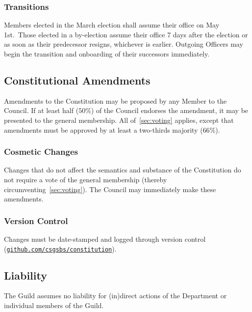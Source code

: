 \subsubsection{Transitions}
Members elected in the March election shall assume their office on May 1st.\
Those elected in a by-election assume their office 7 days after the election or
as soon as their predecessor resigns, whichever is earlier. Outgoing Officers
may begin the transition and onboarding of their successors immediately.

\subsection{Constitutional Amendments}
Amendments to the Constitution may be proposed by any Member to the Council. If
at least half ($50\%$) of the Council endorses the amendment, it may be
presented to the general membership. All of~\ref{sec:voting} applies, except
that amendments must be approved by at least a two-thirds majority ($66\%$).

\subsubsection{Cosmetic Changes}
Changes that do not affect the semantics and substance of the Constitution do
not require a vote of the general membership (thereby
circumventing~\ref{sec:voting}). The Council may immediately make these
amendments.

\subsubsection{Version Control}
Changes must be date-stamped and logged through version control
(\href{https://github.com/csgsbs/constitution}{\texttt{github.com/csgsbs/constitution}}).

\subsection{Liability}
The Guild assumes no liability for (in)direct actions of the Department or
individual members of the Guild.